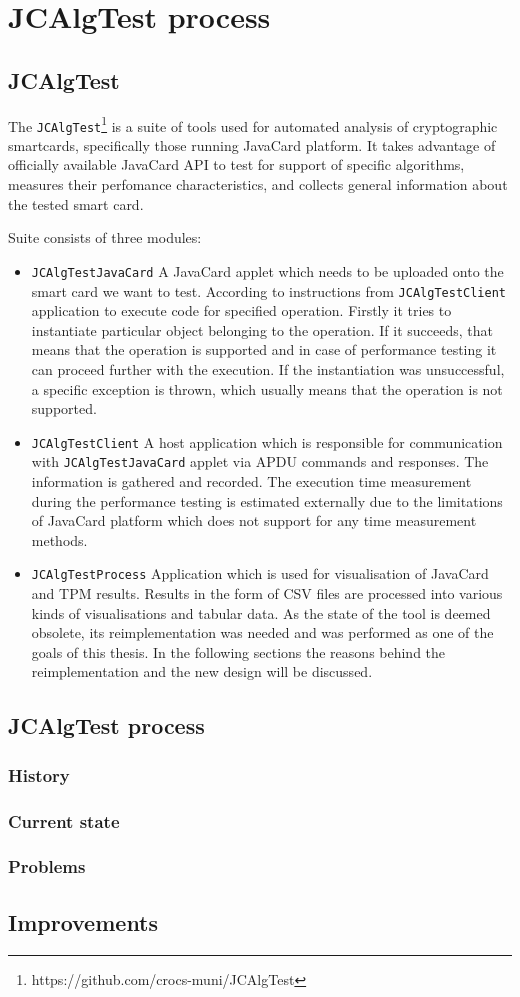 \chapter{JCAlgTest process}
\section{JCAlgTest}
The \texttt{JCAlgTest}\footnote{https://github.com/crocs-muni/JCAlgTest} is a suite of tools used for automated analysis
of cryptographic smartcards, specifically those running JavaCard platform. It takes advantage of officially available
JavaCard API to test for support of specific algorithms, measures their perfomance characteristics, and collects general information about the tested smart card.

Suite consists of three modules:
\begin{itemize}
  \item
        \texttt{JCAlgTestJavaCard} A JavaCard applet which needs to be uploaded onto the smart card we want to test. According to instructions from \texttt{JCAlgTestClient} application to execute code for specified operation. Firstly it tries to instantiate particular object belonging to the operation. If it succeeds, that means that the operation is supported and in case of performance testing it can proceed further with the execution. If the instantiation was unsuccessful, a specific exception is thrown, which usually means that the operation is not supported.
  \item
        \texttt{JCAlgTestClient} A host application which is responsible for communication with \texttt{JCAlgTestJavaCard} applet via APDU commands and responses. The information is gathered and recorded. The execution time measurement during the performance testing  is estimated externally due to the limitations of JavaCard platform which does not support for any time measurement methods.
  \item
        \texttt{JCAlgTestProcess} Application which is used for visualisation of JavaCard and TPM results. Results in the form of CSV files are processed into various kinds of visualisations and tabular data. As the state of the tool is deemed obsolete, its reimplementation was needed and was performed as one of the goals of this thesis. In the following sections the reasons behind the reimplementation and the new design will be discussed.
\end{itemize}

\section{JCAlgTest process}
\subsection{History}
\subsection{Current state}
\subsection{Problems}

\section{Improvements}

